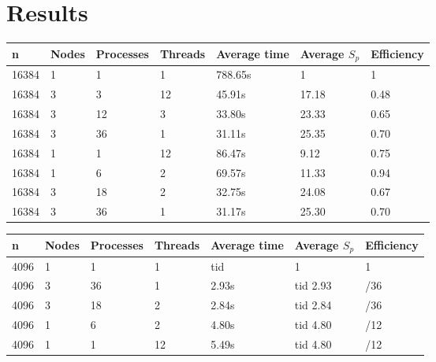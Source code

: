 \section{Results}

\begin{table}[H]
   \centering
    \begin{tabular}{| l | l | l | l | l | l | l |}
    \hline
    \bf{n} & \bf{Nodes} & \bf{Processes} &\bf{Threads} & \bf{Average time} & \bf{Average }$S_{p}$ & \bf{Efficiency} \\ \hline
    	16384 & 1 & 1 & 1 & 788.65s & 1 & 1 \\ \hline
	16384 & 3 & 3 & 12 & 45.91s & 17.18 & 0.48 \\ \hline
	16384 & 3 & 12 & 3 & 33.80s & 23.33 & 0.65 \\ \hline
	16384 & 3 & 36 & 1 & 31.11s & 25.35 & 0.70  \\ \hline
	16384 & 1 & 1 & 12 & 86.47s & 9.12 & 0.75 \\ \hline
	16384 & 1 & 6 & 2 & 69.57s & 11.33 & 0.94 \\ \hline
	16384 & 3 & 18 & 2 & 32.75s & 24.08 & 0.67 \\ \hline
	16384 & 3 & 36 & 1 & 31.17s & 25.30 & 0.70\\ \hline
    \end{tabular}
\end{table}

\begin{table}[H]
   \centering
    \begin{tabular}{| l | l | l | l | l | l | l |}
    \hline
    \bf{n} & \bf{Nodes} & \bf{Processes} &\bf{Threads} & \bf{Average time} & \bf{Average }$S_{p}$ & \bf{Efficiency} \\ \hline
	4096 & 1 & 1 & 1 & tid & 1 & 1 \\ \hline
	4096 & 3 & 36 & 1 & 2.93s & tid 2.93 & /36\\ \hline
	4096 & 3 & 18 & 2 & 2.84s & tid 2.84 & /36 \\ \hline
	4096 & 1 & 6 & 2 & 4.80s & tid 4.80 & /12 \\ \hline
	4096 & 1 & 1 & 12 & 5.49s & tid 4.80 & /12 \\ \hline
    \end{tabular}
\end{table}